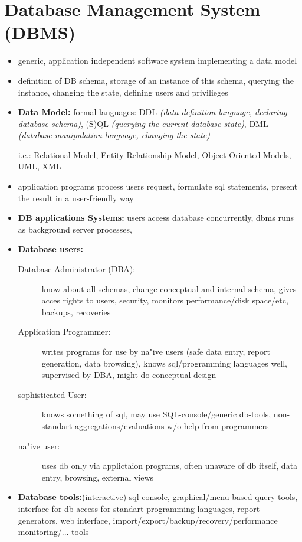 \documentclass{scrartcl}
\begin{document}
\section*{Database Management System (DBMS)}
\begin{itemize}
	\item generic, application independent software system implementing a data model
	\item definition of DB schema, storage of an instance of this schema, querying the instance, changing the state, defining users and privilieges
	\item \textbf{Data Model:} formal languages: DDL \textit{(data definition language, declaring database schema)}, (S)QL \textit{(querying the current database state)}, DML \textit{(database manipulation language, changing the state)}
	\item[i.e.:] Relational Model, Entity Relationship Model, Object-Oriented Models, UML, XML
	\item application programs process users request, formulate sql statements, present the result in a user-friendly way
	\item \textbf{DB applications Systems:} users access database concurrently, dbms runs as background server processes,
	\item \textbf{Database users:}
	\begin{description}
		\item[Database Administrator (DBA):] know about all schemas, change conceptual and internal schema, gives acces rights to users, security, monitors performance/disk space/etc, backups, recoveries
		\item[Application Programmer:] writes programs for use by na"ive users (safe data entry, report generation, data browsing), knows sql/programming languages well, supervised by DBA, might do conceptual design
		\item[sophisticated User:] knows something of sql, may use SQL-console/generic db-tools, non-standart aggregations/evaluations w/o help from programmers
		\item[na"ive user:] uses db only via applictaion programs, often unaware of db itself, data entry, browsing, external views
	\end{description}
	\item \textbf{Database tools:}(interactive) sql console, graphical/menu-based query-tools, interface for db-access for standart programming languages, report generators, web interface, import/export/backup/recovery/performance monitoring/... tools
\end{itemize}
\end{document}
